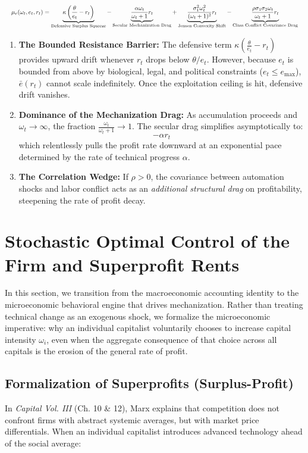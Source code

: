 \documentclass[11pt,letterpaper]{report}
\newcommand{\fitmath}[1]{\begingroup\setbox0=\hbox{$\displaystyle #1$}\ifdim\wd0>\linewidth\resizebox{\linewidth}{!}{$\displaystyle #1$}\else\displaystyle #1\fi\endgroup}
\begin{document}
\[\fitmath{\mu_r(\omega_t, e_t, r_t) = \underbrace{\kappa \left( \frac{\theta}{e_t} - r_t \right)}_{\text{Defensive Surplus Squeeze}} - \underbrace{\frac{\alpha \omega_t}{\omega_t + 1} r_t}_{\text{Secular Mechanization Drag}} + \underbrace{\frac{\sigma_1^2 \omega_t^2}{(\omega_t + 1)^2} r_t}_{\text{Jensen Convexity Shift}} - \underbrace{\frac{\rho \sigma_1 \sigma_2 \omega_t}{\omega_t + 1} r_t}_{\text{Class Conflict Covariance Drag}}}\]
\begin{enumerate}
\item \textbf{The Bounded Resistance Barrier:} The defensive term $\kappa (\frac{\theta }{{e}_{t}}-{r}_{t})$ provides upward drift whenever ${r}_{t}$ drops below $\theta /{e}_{t}$. However, because ${e}_{t}$ is bounded from above by biological, legal, and political constraints (${e}_{t}\leq {e}_{\max}$), $\bar{e}({r}_{t})$ cannot scale indefinitely. Once the exploitation ceiling is hit, defensive drift vanishes.
\item \textbf{Dominance of the Mechanization Drag:} As accumulation proceeds and ${\omega }_{t}\rightarrow \infty$, the fraction $\frac{{\omega }_{t}}{{\omega }_{t}+1}\rightarrow 1$. The secular drag simplifies asymptotically to:
\[
-\alpha {r}_{t}
\]
which relentlessly pulls the profit rate downward at an exponential pace determined by the rate of technical progress $\alpha$.
\item \textbf{The Correlation Wedge:} If $\rho >0$, the covariance between automation shocks and labor conflict acts as an \emph{additional structural drag} on profitability, steepening the rate of profit decay.
\end{enumerate}
\section{Stochastic Optimal Control of the Firm and Superprofit Rents}
In this section, we transition from the macroeconomic accounting identity to the microeconomic behavioral engine that drives mechanization. Rather than treating technical change as an exogenous shock, we formalize the microeconomic imperative: why an individual capitalist voluntarily chooses to increase capital intensity ${\omega }_{i}$, even when the aggregate consequence of that choice across all capitals is the erosion of the general rate of profit.

\subsection{Formalization of Superprofits (Surplus-Profit)}
In \emph{Capital Vol. III} (Ch. 10 \& 12), Marx explains that competition does not confront firms with abstract systemic averages, but with market price differentials. When an individual capitalist introduces advanced technology ahead of the social average:
\end{document}
